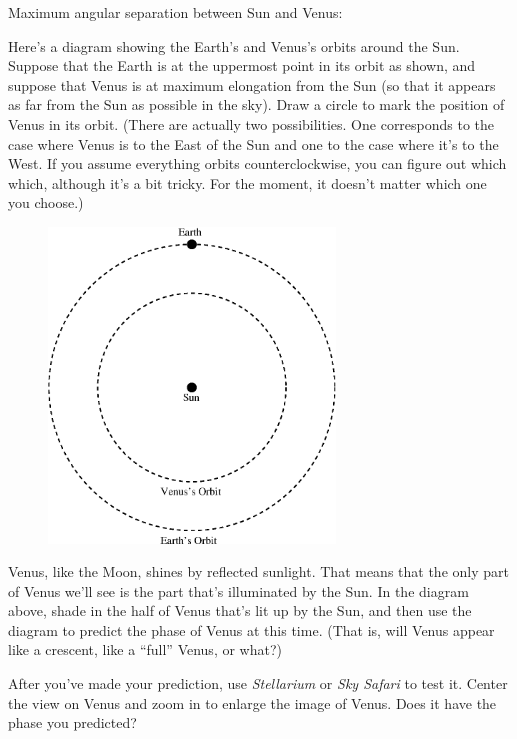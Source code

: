 Maximum angular separation between Sun and Venus:

\answerspace{0.7in}

\pagebreak[3]

Here's a diagram showing the Earth's and Venus's orbits around the
Sun.  Suppose that the Earth is at the uppermost point in its orbit as
shown, and suppose that Venus is at maximum elongation from the Sun
(so that it appears as far from the Sun as possible in the sky).  Draw
a circle to mark the position of Venus in its orbit.  (There are
actually two possibilities.  One corresponds to the case where Venus
is to the East of the Sun and one to the case where it's to the West.
If you assume everything orbits
counterclockwise, you can figure out which which, although
it's a bit tricky.  For the moment, it doesn't matter which one you choose.)

\begin{figure}[h]
\centerline{\includegraphics[width=3in]{phasesofvenus/venus1.eps}}
\end{figure}


Venus, like the Moon, shines by reflected sunlight.  That means that
the only part of Venus we'll see is the part that's illuminated by the 
Sun.  In the diagram above, shade in the half of Venus that's lit up by
the Sun, and then use the diagram to predict the phase of Venus
at this time.  (That is, will Venus appear like a crescent, like
a ``full'' Venus, or what?)

\answerspace{0.6in}

After you've made your prediction, use \textit{Stellarium}
or \textit{Sky Safari}  to test it.
Center the view on Venus and zoom in to enlarge the image of Venus.
Does it have the phase you predicted?

